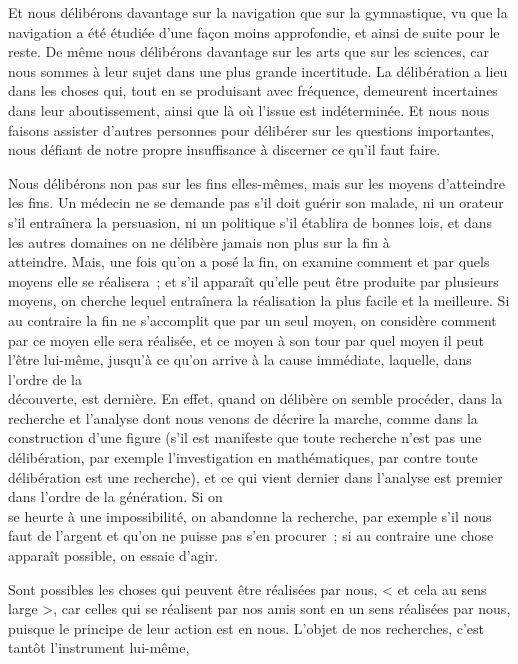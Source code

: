 \documentclass[french,twoside]{book} %
\begin{document}
Et nous délibérons davantage sur la navigation que sur la gymnastique, vu que la navigation a été étudiée d’une façon moins approfondie, et ainsi de suite pour le reste. De même nous délibérons davantage sur les arts que sur les sciences, car nous sommes à leur sujet dans une plus grande incertitude. La délibération a lieu dans les choses qui, tout en se produisant avec fréquence, demeurent incertaines dans leur aboutissement, ainsi que là où l’issue est indéterminée. Et nous nous \\
faisons assister d’autres personnes pour délibérer sur les questions importantes, nous défiant de notre propre insuffisance à discerner ce qu’il faut faire.\par
Nous délibérons non pas sur les fins elles-mêmes, mais sur les moyens d’atteindre les fins. Un médecin ne se demande pas s’il doit guérir son malade, ni un orateur s’il entraînera la persuasion, ni un politique s’il établira de bonnes lois, et dans les autres domaines on ne délibère jamais non plus sur la fin à \\
atteindre. Mais, une fois qu’on a posé la fin, on examine comment et par quels moyens elle se réalisera ; et s’il apparaît qu’elle peut être produite par plusieurs moyens, on cherche lequel entraînera la réalisation la plus facile et la meilleure. Si au contraire la fin ne s’accomplit que par un seul moyen, on considère comment par ce moyen elle sera réalisée, et ce moyen à son tour par quel moyen il peut l’être lui-même, jusqu’à ce qu’on arrive à la cause immédiate, laquelle, dans l’ordre de la \\
découverte, est dernière. En effet, quand on délibère on semble procéder, dans la recherche et l’analyse dont nous venons de décrire la marche, comme dans la construction d’une figure (s’il est manifeste que toute recherche n’est pas une délibération, par exemple l’investigation en mathématiques, par contre toute délibération est une recherche), et ce qui vient dernier dans l’analyse est premier dans l’ordre de la génération. Si on \\
se heurte à une impossibilité, on abandonne la recherche, par exemple s’il nous faut de l’argent et qu’on ne puisse pas s’en procurer ; si au contraire une chose apparaît possible, on essaie d’agir.\par
Sont possibles les choses qui peuvent être réalisées par nous, < et cela au sens large >, car celles qui se réalisent par nos amis sont en un sens réalisées par nous, puisque le principe de leur action est en nous. L’objet de nos recherches, c’est tantôt l’instrument lui-même, \\
\end{document}
